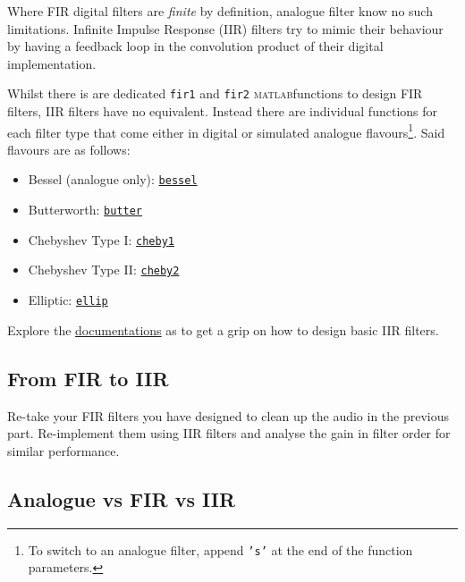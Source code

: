 \documentclass{../template/labo}
\author{DLH}
\newcommand{\matlab}{\textsc{matlab}}
\begin{document}

Where FIR digital filters are \textit{finite} by definition, analogue filter know no such limitations.
Infinite Impulse Response (IIR) filters try to mimic their behaviour by having a feedback loop in the convolution product of their digital implementation.

Whilst there is are dedicated \texttt{fir1} and \texttt{fir2} \matlab functions to design FIR filters, IIR filters have no equivalent.
Instead there are individual functions for each filter type that come either in digital or simulated analogue flavours\footnote{To switch to an analogue filter, append \texttt{'s'} at the end of the function parameters.}.
Said flavours are as follows:
\begin{itemize}
  \item Bessel (analogue only): \href{https://nl.mathworks.com/help/signal/ref/besself.html}{\texttt{bessel}}
  \item Butterworth: \href{https://nl.mathworks.com/help/signal/ref/butter.html}{\texttt{butter}}
  \item Chebyshev Type I: \href{https://nl.mathworks.com/help/signal/ref/cheby1.html}{\texttt{cheby1}}
  \item Chebyshev Type II: \href{https://nl.mathworks.com/help/signal/ref/cheby2.html}{\texttt{cheby2}}
  \item Elliptic: \href{https://nl.mathworks.com/help/signal/ref/ellip.html}{\texttt{ellip}}
\end{itemize}

\begin{leftbar}
Explore the \href{https://nl.mathworks.com/help/signal/ug/iir-filter-design.html}{documentations} as to get a grip on how to design basic IIR filters.
\end{leftbar}

\subsection*{From FIR to IIR}

Re-take your FIR filters you have designed to clean up the audio in the previous part.
Re-implement them using IIR filters and analyse the gain in filter order for similar performance.



\subsection*{Analogue vs FIR vs IIR}
\end{document}
